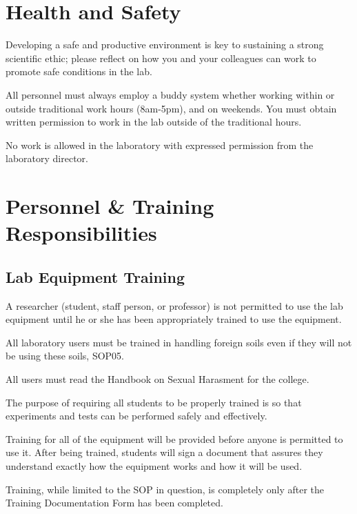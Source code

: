 \documentclass[12pt]{../SOP4_alpha}\usepackage[]{graphicx}\usepackage[]{color}
\begin{document}

\section{Health and Safety}

\NP Developing a safe and productive environment is key to sustaining a strong scientific ethic; please reflect on how you and your colleagues can work to promote safe conditions in the lab.

\NP All personnel must always employ a buddy system whether working within or outside traditional work hours (8am-5pm), and on weekends. You must obtain written permission to work in the lab outside of the traditional hours.

\NP No work is allowed in the laboratory with expressed permission from the laboratory director.

\section{Personnel \& Training Responsibilities}

\subsection*{Lab Equipment Training}

\NP A researcher (student, staff person, or professor) is not permitted to use the lab equipment until he or she has been appropriately trained to use the equipment.

\NP All laboratory users must be trained in handling foreign soils even if they will not be using these soils, SOP05.

\NP All users must read the Handbook on Sexual Harasment for the college.

\NP The purpose of requiring all students to be properly trained is so that experiments and tests can be performed safely and effectively.  

\NP Training for all of the equipment will be provided before anyone is permitted to use it.  After being trained, students will sign a document that assures they understand exactly how the equipment works and how it will be used.

\NP Training, while limited to the SOP in question, is completely only after the Training Documentation Form has been completed.
\end{document}
